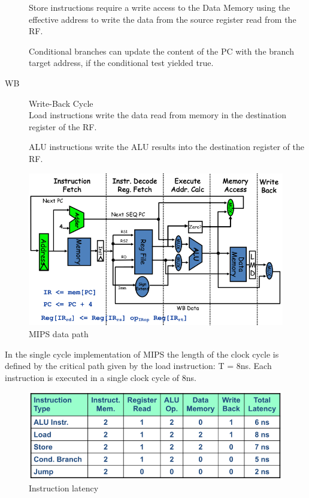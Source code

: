 \begin{description}
        Store instructions require a write access to the Data
        Memory using the effective address to write the data
        from the source register read from the RF\@.

        Conditional branches can update the content of the PC
        with the branch target address, if the conditional test
        yielded true.

    \item[WB] Write-Back Cycle\\
        Load instructions write the data read from memory in
        the destination register of the RF\@.

        ALU instructions write the ALU results into the
        destination register of the RF\@.
\end{description}


\begin{figure}[h]
    \centering
    \includegraphics[scale = 0.35]{images/MIPS-data-path}
    \caption{MIPS data path}
    \label{fig:mips-data-path}
\end{figure}

In the single cycle implementation of MIPS the length of the clock cycle is defined by the critical path given by the
load instruction: T = 8ns.
Each instruction is executed in a single clock cycle of 8ns.
\begin{figure}[h]
    \centering
    \includegraphics[scale=0.38]{images/instructions-latency}
    \caption{Instruction latency}
    \label{fig:instruction-latency}
\end{figure}

